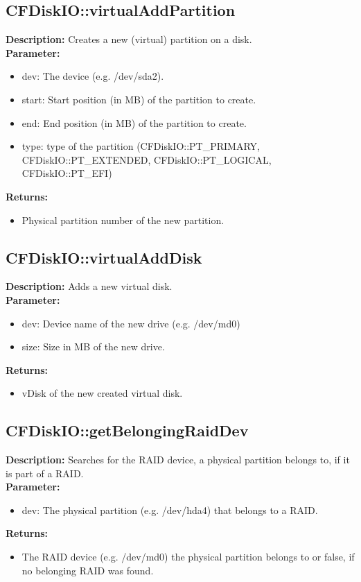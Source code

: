 \subsection{CFDiskIO::virtualAddPartition}
\textbf{Description:} Creates a new (virtual) partition on a disk.\\
\textbf{Parameter:}
\begin{itemize}
\item dev: The device (e.g. /dev/sda2).
\item start: Start position (in MB) of the partition to create.
\item end: End position (in MB) of the partition to create.
\item type: type of the partition (CFDiskIO::PT\_PRIMARY, CFDiskIO::PT\_EXTENDED, CFDiskIO::PT\_LOGICAL, CFDiskIO::PT\_EFI)
\end{itemize}
\textbf{Returns:}
\begin{itemize}
\item Physical partition number of the new partition.
\end{itemize}

\subsection{CFDiskIO::virtualAddDisk}
\textbf{Description:} Adds a new virtual disk.\\
\textbf{Parameter:}
\begin{itemize}
\item dev: Device name of the new drive (e.g. /dev/md0)
\item size: Size in MB of the new drive.
\end{itemize}
\textbf{Returns:}
\begin{itemize}
\item vDisk of the new created virtual disk.
\end{itemize}

\subsection{CFDiskIO::getBelongingRaidDev}
\textbf{Description:} Searches for the RAID device, a physical partition belongs to, if it is part of a RAID.\\
\textbf{Parameter:}
\begin{itemize}
\item dev: The physical partition (e.g. /dev/hda4) that belongs to a RAID.
\end{itemize}
\textbf{Returns:}
\begin{itemize}
\item The RAID device (e.g. /dev/md0) the physical partition belongs to or false, if no belonging RAID was found.
\end{itemize}

